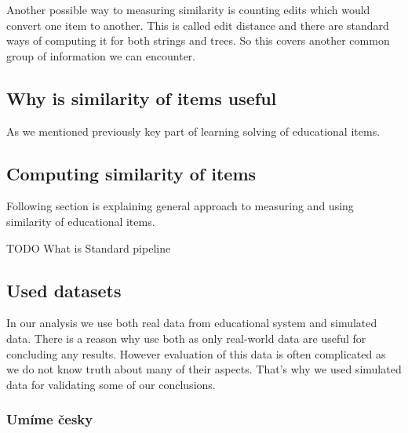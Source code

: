 \documentclass[
  digital, %
  table,   %
  nolof,     %
  nolot,     %
  nocover
]{fithesis3}
\begin{document}
Another possible way to measuring similarity is counting edits which would convert one item to another. This is called edit distance and there are standard ways of computing it for both strings and trees. So this covers another common group of information we can encounter.

\subsection{Why is similarity of items useful}\label{why-is-similarity-of-items-useful}


As we mentioned previously key part of learning solving of educational
items.

\subsection{Computing similarity of
items}\label{computing-similarity-of-items}


Following section is explaining general approach to measuring and using similarity of educational
items.


TODO What is Standard pipeline

\subsection{Used datasets}\label{used-datasets}



In our analysis we use both real data from educational system and
simulated data. There is a reason why use both as only real-world data
are useful for concluding any results. However evaluation of this data
is often complicated as we do not know truth about many of their
aspects. That's why we used simulated data for validating some of our
conclusions.

\subsubsection{Umíme česky}\label{umime-cesky}

\end{document}
